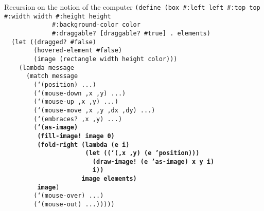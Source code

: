 \begin{frame}{Recursion on the notion of the computer}
  \tiny
  \texttt{(define (box \#:left left \#:top top \#:width width \#:height height\\
    \ \ \ \ \ \ \ \ \ \ \ \ \ \#:background-color color\\
    \ \ \ \ \ \ \ \ \ \ \ \ \ \#:draggable? [draggable? \#true] . elements)\\
    \ \ (let ((dragged? \#false)\\
    \ \ \ \ \ \ \ \ (hovered-element \#false)\\
    \ \ \ \ \ \ \ \ (image (rectangle width height color)))\\
    \ \ \ \ (lambda message\\
    \ \ \ \ \ \ (match message\\
    \ \ \ \ \ \ \ \ (`(position) ...)\\
    \ \ \ \ \ \ \ \ (`(mouse-down ,x ,y) ...)\\
    \ \ \ \ \ \ \ \ (`(mouse-up ,x ,y) ...)\\
    \ \ \ \ \ \ \ \ (`(mouse-move ,x ,y ,dx ,dy) ...)\\
    \ \ \ \ \ \ \ \ (`(embraces? ,x ,y) ...)\\
    \ \ \ \ \ \ \ \ (\textbf{`(as-image)\\
      \ \ \ \ \ \ \ \ \ (fill-image!\ image 0)\\
      \ \ \ \ \ \ \ \ \ (fold-right (lambda (e i)\\
      \ \ \ \ \ \ \ \ \ \ \ \ \ \ \ \ \ \ \ \ \ \ (let ((`(,x ,y) (e 'position)))\\
      \ \ \ \ \ \ \ \ \ \ \ \ \ \ \ \ \ \ \ \ \ \ \ \ (draw-image!\ (e 'as-image) x y i)\\
      \ \ \ \ \ \ \ \ \ \ \ \ \ \ \ \ \ \ \ \ \ \ \ \ i))\\
      \ \ \ \ \ \ \ \ \ \ \ \ \ \ \ \ \ \ \ \ \ image elements)\\
      \ \ \ \ \ \ \ \ \ image})\\
    \ \ \ \ \ \ \ \ (`(mouse-over) ...)\\
    \ \ \ \ \ \ \ \ (`(mouse-out) ...)))))\\
    \ \\
    \ \\
    \ \\
    \ \\
    \ 
  }
\end{frame}


